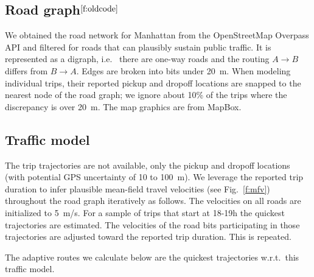 \documentclass[12pt,notitlepage]{article}
\begin{document}
\subsection{Road graph${}^{\ref{f:oldcode}}$} 
\label{s:graph}



We obtained the road network for Manhattan
%
from the OpenStreetMap Overpass API
and filtered for roads that can plausibly sustain public traffic.
%
%
It is represented as a digraph,
i.e.~%
there are one-way roads 
and
the routing $A \to B$ differs from $B \to A$.
%
Edges are broken into bits under \SI{20}{m}.
%
%
When modeling individual trips,
their reported pickup and dropoff locations
are snapped to the nearest node of the road graph;
we ignore about 10\% of the trips 
where the discrepancy is over \SI{20}{m}.
%
%
%
%
The map graphics are from MapBox.



\subsection{Traffic model} \label{s:traffic}

The trip trajectories are not available,
only the pickup and dropoff locations
(with potential GPS uncertainty of 10 to \SI{100}{m}).
%
%
We leverage the reported trip duration to
infer plausible mean-field travel velocities 
(see Fig.~\ref{f:mfv})
throughout the road graph
iteratively as follows.
%
The velocities on all roads are initialized to \SI{5}{m/s}.
%
For a sample of trips that start at 18-19h
the quickest trajectories are estimated.
%
The velocities of the road bits participating in those trajectories
are adjusted toward the reported trip duration.
%
This is repeated.
%
%
%
%

The adaptive routes we calculate below
are the quickest trajectories
w.r.t.~this traffic model.
\end{document}

